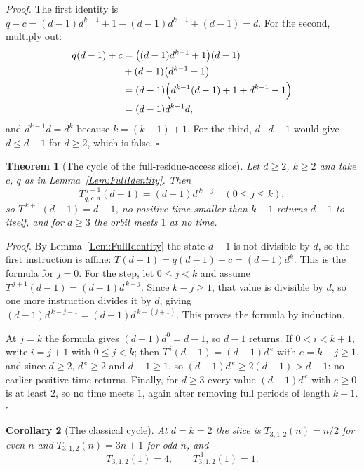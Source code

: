 \documentclass[11pt,letterpaper]{article}
\newtheorem{theorem}{Theorem}
\newtheorem{corollary}[theorem]{Corollary}
\newenvironment{proof}{\noindent\textit{Proof.}}{\hfill\(\square\)}
\begin{document}
\begin{proof}
The first identity is
\(q-c=(d-1)d^{k-1}+1-(d-1)d^{k-1}+(d-1)=d\). For the second, multiply out:
\[
\begin{aligned}
 q(d-1)+c
 &=\bigl((d-1)d^{k-1}+1\bigr)(d-1)\\
 &{}+(d-1)\bigl(d^{k-1}-1\bigr)\\
 &=(d-1)\Bigl(d^{k-1}(d-1)+1+d^{k-1}-1\Bigr)\\
 &=(d-1)d^{k-1}d,
\end{aligned}
\]
and \(d^{k-1}d=d^{k}\) because \(k=(k-1)+1\). For the third, \(d\mid d-1\)
would give \(d\le d-1\) for \(d\ge2\), which is false.
\end{proof}

\begin{theorem}[The cycle of the full-residue-access slice]\label{Thm:FullLoop}
Let \(d\ge2\), \(k\ge2\) and take \(c\), \(q\) as in
Lemma~\ref{Lem:FullIdentity}. Then
\[
 T_{q,c,d}^{\,j+1}(d-1)=(d-1)d^{\,k-j}\quad(0\le j\le k),
\]
so \(T^{\,k+1}(d-1)=d-1\), no positive time smaller than \(k+1\) returns
\(d-1\) to itself, and for \(d\ge3\) the orbit meets \(1\) at no time.
\end{theorem}

\begin{proof}
By Lemma~\ref{Lem:FullIdentity} the state \(d-1\) is not divisible by \(d\), so
the first instruction is affine:
\(T(d-1)=q(d-1)+c=(d-1)d^{k}\). This is the formula for \(j=0\). For the step,
let \(0\le j<k\) and assume \(T^{\,j+1}(d-1)=(d-1)d^{\,k-j}\). Since
\(k-j\ge1\), that value is divisible by \(d\), so one more instruction divides
it by \(d\), giving \((d-1)d^{\,k-j-1}=(d-1)d^{\,k-(j+1)}\). This proves the
formula by induction.

At \(j=k\) the formula gives \((d-1)d^{0}=d-1\), so \(d-1\) returns. If
\(0<i<k+1\), write \(i=j+1\) with \(0\le j<k\); then
\(T^{\,i}(d-1)=(d-1)d^{\,e}\) with \(e=k-j\ge1\), and since \(d\ge2\),
\(d^{\,e}\ge2\) and \(d-1\ge1\), so \((d-1)d^{\,e}\ge2(d-1)>d-1\): no earlier
positive time returns. Finally, for \(d\ge3\) every value
\((d-1)d^{\,e}\) with \(e\ge0\) is at least \(2\), so no time meets \(1\),
again after removing full periods of length \(k+1\).
\end{proof}

\begin{corollary}[The classical cycle]\label{Cor:Classical}
At \(d=k=2\) the slice is \(T_{3,1,2}(n)=n/2\) for even \(n\) and
\(T_{3,1,2}(n)=3n+1\) for odd \(n\), and
\[
 T_{3,1,2}(1)=4,\qquad T_{3,1,2}^{\,3}(1)=1 .
\]
\end{corollary}
\end{document}
